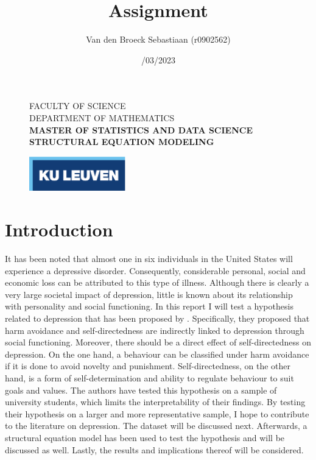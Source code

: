 \documentclass[11pt]{article}
\title{\vspace*{40.0mm}
  \bf\sf Assignment
         \vspace*{20.0mm} \\
  \vspace*{40.0mm}}
\author{\sf Van den Broeck Sebastiaan (r0902562)}
\date{\sf 13/03/2023}
\begin{document}
\begin{figure}
  \parbox[t]{125mm}{
    \vspace*{6mm}
    \scriptsize\sf           FACULTY OF SCIENCE \\
    \scriptsize\sf           DEPARTMENT OF MATHEMATICS \\
    \scriptsize\sf\bfseries  MASTER OF STATISTICS AND DATA SCIENCE \\
    \scriptsize\sf\bfseries  STRUCTURAL EQUATION MODELING \\}
  \parbox[t]{40mm}{
    \begin{flushright}
      \includegraphics[height=15mm]{logo.eps.pdf}
    \end{flushright}}
\end{figure}

\maketitle
\thispagestyle{empty}
\raggedbottom

\cleardoublepage
\setcounter{page}{1}
\setcounter{tocdepth}{3}

\section{Introduction}

It has been noted that almost one in six individuals in the United States will experience a depressive disorder.
Consequently, considerable personal, social and economic loss can be attributed to this type of illness.
Although there is clearly a very large societal impact of depression, little is known about its relationship with personality and social functioning. In this report I will test a hypothesis related to depression that has been proposed by \textcite{tse2011}.
Specifically, they proposed that harm avoidance and self-directedness are indirectly linked to depression through social functioning.
Moreover, there should be a direct effect of self-directedness on depression.
On the one hand, a behaviour can be classified under harm avoidance if it is done to avoid novelty and punishment.
Self-directedness, on the other hand, is a form of self-determination and ability to regulate behaviour to suit goals and values.
The authors have tested this hypothesis on a sample of university students, which limits the interpretability of their findings.
By testing their hypothesis on a larger and more representative sample, I hope to contribute to the literature on depression.
The dataset will be discussed next.
Afterwards, a structural equation model has been used to test the hypothesis and will be discussed as well.
Lastly, the results and implications thereof will be considered.
\end{document}
